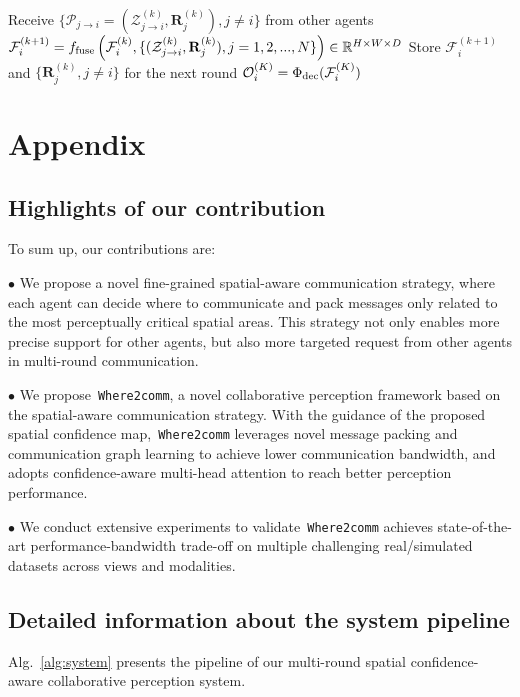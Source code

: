 \begin{algorithm}[!t]
\begin{algorithmic}[1]
    	        \State Receive $\{\mathcal{P}_{j\rightarrow i}=\left(\mathcal{Z}_{j\rightarrow i}^{(k)},\mathbf{R}_j^{(k)}\right), j \neq i \}$ from other agents
    	        \State {\color{blue} { \#~Message fusion}}
	            \State $\mathcal{F}_{i}^{(k+1)}=f_{\rm fuse} \left(\mathcal{F}_{i}^{(k)},\{(\mathcal{Z}_{j\rightarrow i}^{(k)},\mathbf{R}_{j}^{(k)}), j=1,2,...,N\}\right)\in \mathbb{R}^{H\times W\times D}$ 
	       \EndFor
	       \State Store $\mathcal{F}_{i}^{(k+1)}$ and $\{\mathbf{R}_{j}^{(k)},j \neq i\}$ for the next round
	    \EndFor
    \State $\mathcal{O}_{i}^{(K)}=\Phi_{\rm dec}(\mathcal{F}_{i}^{(K)})$
	\end{algorithmic} 
	\label{alg:system}
\end{algorithm}

\section{Appendix}

\subsection{Highlights of our contribution}
To sum up, our contributions are:

$\bullet$ We propose a novel fine-grained spatial-aware communication strategy, where each agent can decide where to communicate and pack messages only related to the most perceptually critical spatial areas. This strategy not only enables more precise support for other agents, but also more targeted request from other agents in multi-round communication.

$\bullet$ We propose~\texttt{Where2comm}, a novel collaborative perception framework based on the spatial-aware communication strategy. With the guidance of the proposed spatial confidence map,~\texttt{Where2comm} leverages novel message packing and communication graph learning to  achieve lower communication bandwidth, and adopts confidence-aware multi-head attention to reach better perception performance.

$\bullet$ We conduct extensive experiments to validate~\texttt{Where2comm} achieves state-of-the-art performance-bandwidth trade-off on multiple challenging real/simulated datasets across views and modalities. 

\subsection{Detailed information about the system pipeline}
Alg.~\ref{alg:system} presents the pipeline of our multi-round spatial confidence-aware collaborative perception system.


